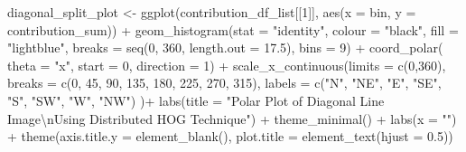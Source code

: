 \documentclass[
  letterpaper,
  DIV=11,
  numbers=noendperiod]{scrreprt}
\newenvironment{Shaded}{\begin{snugshade}}{\end{snugshade}}
\newcommand{\AttributeTok}[1]{\textcolor[rgb]{0.40,0.45,0.13}{#1}}
\newcommand{\DecValTok}[1]{\textcolor[rgb]{0.68,0.00,0.00}{#1}}
\newcommand{\FloatTok}[1]{\textcolor[rgb]{0.68,0.00,0.00}{#1}}
\newcommand{\FunctionTok}[1]{\textcolor[rgb]{0.28,0.35,0.67}{#1}}
\newcommand{\NormalTok}[1]{\textcolor[rgb]{0.00,0.23,0.31}{#1}}
\newcommand{\OtherTok}[1]{\textcolor[rgb]{0.00,0.23,0.31}{#1}}
\newcommand{\SpecialCharTok}[1]{\textcolor[rgb]{0.37,0.37,0.37}{#1}}
\newcommand{\StringTok}[1]{\textcolor[rgb]{0.13,0.47,0.30}{#1}}
\begin{document}
\begin{Shaded}
\begin{Highlighting}[]
\NormalTok{diagonal\_split\_plot }\OtherTok{\textless{}{-}}
  \FunctionTok{ggplot}\NormalTok{(contribution\_df\_list[[}\DecValTok{1}\NormalTok{]], }
         \FunctionTok{aes}\NormalTok{(}\AttributeTok{x =}\NormalTok{ bin, }\AttributeTok{y =}\NormalTok{ contribution\_sum)) }\SpecialCharTok{+}
  \FunctionTok{geom\_histogram}\NormalTok{(}\AttributeTok{stat =} \StringTok{"identity"}\NormalTok{,}
                 \AttributeTok{colour =} \StringTok{"black"}\NormalTok{, }
                 \AttributeTok{fill =} \StringTok{"lightblue"}\NormalTok{, }
                 \AttributeTok{breaks =} \FunctionTok{seq}\NormalTok{(}\DecValTok{0}\NormalTok{, }\DecValTok{360}\NormalTok{, }\AttributeTok{length.out =} \FloatTok{17.5}\NormalTok{),}
                 \AttributeTok{bins =} \DecValTok{9}\NormalTok{) }\SpecialCharTok{+}
  \FunctionTok{coord\_polar}\NormalTok{(}
    \AttributeTok{theta =} \StringTok{"x"}\NormalTok{, }\AttributeTok{start =} \DecValTok{0}\NormalTok{, }\AttributeTok{direction =} \DecValTok{1}\NormalTok{) }\SpecialCharTok{+}
  \FunctionTok{scale\_x\_continuous}\NormalTok{(}\AttributeTok{limits =} \FunctionTok{c}\NormalTok{(}\DecValTok{0}\NormalTok{,}\DecValTok{360}\NormalTok{),}
    \AttributeTok{breaks =} \FunctionTok{c}\NormalTok{(}\DecValTok{0}\NormalTok{, }\DecValTok{45}\NormalTok{, }\DecValTok{90}\NormalTok{, }\DecValTok{135}\NormalTok{, }\DecValTok{180}\NormalTok{, }\DecValTok{225}\NormalTok{, }\DecValTok{270}\NormalTok{, }\DecValTok{315}\NormalTok{), }
    \AttributeTok{labels =} \FunctionTok{c}\NormalTok{(}\StringTok{"N"}\NormalTok{, }\StringTok{"NE"}\NormalTok{, }\StringTok{"E"}\NormalTok{, }\StringTok{"SE"}\NormalTok{, }\StringTok{"S"}\NormalTok{, }\StringTok{"SW"}\NormalTok{, }\StringTok{"W"}\NormalTok{, }\StringTok{"NW"}\NormalTok{)}
\NormalTok{  )}\SpecialCharTok{+}
  \FunctionTok{labs}\NormalTok{(}\AttributeTok{title =} \StringTok{"Polar Plot of Diagonal Line Image}\SpecialCharTok{\textbackslash{}n}\StringTok{Using Distributed HOG Technique"}\NormalTok{) }\SpecialCharTok{+}
  \FunctionTok{theme\_minimal}\NormalTok{() }\SpecialCharTok{+}
  \FunctionTok{labs}\NormalTok{(}\AttributeTok{x =} \StringTok{""}\NormalTok{) }\SpecialCharTok{+}
  \FunctionTok{theme}\NormalTok{(}\AttributeTok{axis.title.y =} \FunctionTok{element\_blank}\NormalTok{(),}
        \AttributeTok{plot.title =} \FunctionTok{element\_text}\NormalTok{(}\AttributeTok{hjust =} \FloatTok{0.5}\NormalTok{))}
\end{Highlighting}
\end{Shaded}
\end{document}

